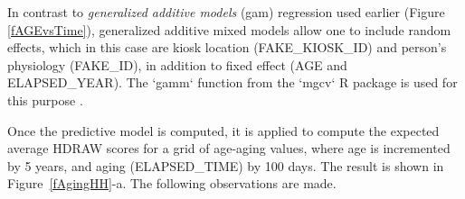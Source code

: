 \documentclass{cta-author}%
\newcommand{\cmt}[1]{}
\begin{document}
In contrast to {\it generalized additive  models} (gam) regression used earlier (Figure \ref{fAGEvsTime}), 
generalized additive mixed models allow one to include random effects, which in this case are kiosk location (FAKE\_KIOSK\_ID) and person's physiology (FAKE\_ID), in addition to fixed effect (AGE and ELAPSED\_YEAR).
The `gamm` function from the `mgcv` R package is used for this purpose \cite{R-gam}.

\cmt{
Using the `mgcv` R package \cite{R-gam}, the relationship between the effects and the output value (HDRAW) is defined by the following 
formula:
{\scriptsize  
\begin{verbatim}  
model = gamm( HDRAW ~ te(ELAPSED_TIME, AGE), data=OPS_XING,
              random=list(FAKE_ID=~1, FAKE_KIOSK_ID=~1) ) 
\end{verbatim}
}


In this formula,  {\tt te()} is used to  apply a tensor product smooth to obtain better smoothing for the function on the marginal values.
}

Once the predictive model is computed, it is applied to compute the  expected average HDRAW scores for a grid of age-aging values,  where age is incremented by 5 years, and aging (ELAPSED\_TIME) by 100 days. The result 
is shown in Figure~\ref{fAgingHH}-a.
The following  observations are made.

\cmt{
shows the  heatmap of  HDNORM scores for different Age at Passage  and different number of years since enrollment (ELAPSED\_YEAR).
The top image shows interpolated (i.e., averaged between adjacent bins) mathematical average of HDNORM for each `age'-`aging' group. 
The bottom image shows average  HDNORM scores for different Age and ELAPSED\_YEAR computed using generalized additive model regression. Data from all kiosks and all cameras are used. 

}
\end{document}
